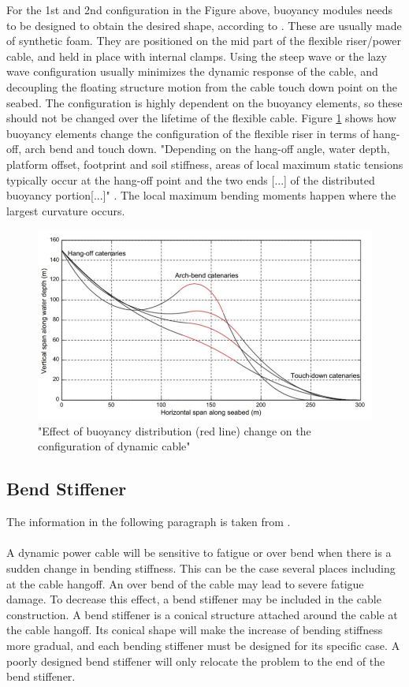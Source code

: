 \noindent For the 1st and 2nd configuration in the Figure above, buoyancy modules needs to be designed to obtain the desired shape, according to \cite{srinil2016}. These are usually made of synthetic foam. They are positioned on the mid part of the flexible riser/power cable, and held in place with internal clamps. Using the steep wave or the lazy wave configuration usually minimizes the dynamic response of the cable, and decoupling the floating structure motion from the cable touch down point on the seabed. The configuration is highly dependent on the buoyancy elements, so these should not be changed over the lifetime of the flexible cable. Figure \ref{fig:bend} shows how buoyancy elements change the configuration of the flexible riser in terms of hang-off, arch bend and touch down. "Depending on the hang-off angle, water depth, platform offset, footprint and soil stiffness, areas of local maximum static tensions typically occur at the hang-off point and
the two ends [...] of the distributed buoyancy portion[...]" \cite{srinil2016}. The local maximum bending moments happen where the largest curvature occurs.

\begin{figure}[H]
\centering
\includegraphics[scale=0.6]{figures/bend}
\caption[$\; \:$Effect of buoyancy distribution]{"Effect of buoyancy distribution (red line) change on the configuration of dynamic
cable" \cite{srinil2016}}
 \label{fig:bend}
\end{figure}
\subsection{Bend Stiffener}
The information in the following paragraph is taken from \cite{Worzyk}.\\\\
A dynamic power cable will be sensitive to fatigue or over bend when there is a sudden change in bending stiffness. This can be the case several places including at the cable hangoff. An over bend of the cable may lead to severe fatigue damage. To decrease this effect, a bend stiffener may be included in the cable construction. A bend stiffener is a conical structure attached around the cable at the cable hangoff. Its conical shape will make the increase of bending stiffness more gradual, and each bending stiffener must be designed for its specific case. A poorly designed bend stiffener will only relocate the problem to the end of the bend stiffener.


